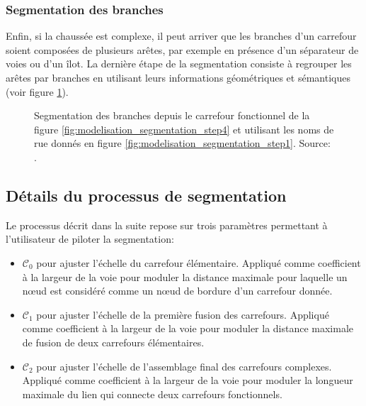 \subsubsection{Segmentation des branches}

Enfin, si la chaussée est complexe, il peut arriver que les branches d'un carrefour soient composées de plusieurs arêtes, par exemple en présence d'un séparateur de voies ou d'un îlot. La dernière étape de la segmentation consiste à regrouper les arêtes par branches en utilisant leurs informations géométriques et sémantiques (voir figure \ref{fig:modelisation_segmentation_step5}).

\begin{figure}[ht]
    \centering
    \caption[Segmentation des branches d'un carrefour]{Segmentation des branches depuis le carrefour fonctionnel de la figure \ref{fig:modelisation_segmentation_step4} et utilisant les noms de rue donnés en figure {\ref{fig:modelisation_segmentation_step1}}. Source: \citep{Favreau2022}.}
    \label{fig:modelisation_segmentation_step5}
\end{figure}

\subsection{Détails du processus de segmentation}

Le processus décrit dans la suite repose sur trois paramètres permettant à l'utilisateur de piloter la segmentation:

\begin{itemize}
    \item $\mathcal{C}_0$ pour ajuster l'échelle du carrefour élémentaire. Appliqué comme coefficient à la largeur de la voie pour moduler la distance maximale pour laquelle un nœud est considéré comme un nœud de bordure d'un carrefour donnée.
    \item $\mathcal{C}_1$ pour ajuster l'échelle de la première fusion des carrefours. Appliqué comme coefficient à la largeur de la voie pour moduler la distance maximale de fusion de deux carrefours élémentaires.
    \item $\mathcal{C}_2$ pour ajuster l'échelle de l'assemblage final des carrefours complexes. Appliqué comme coefficient à la largeur de la voie pour moduler la longueur maximale du lien qui connecte deux carrefours fonctionnels.
\end{itemize}

